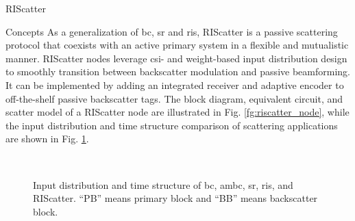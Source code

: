 \documentclass[journal]{IEEEtran}
\begin{document}
\begin{section}{RIScatter}
	\begin{subsection}{Concepts}
		As a generalization of \gls{bc}, \gls{sr} and \gls{ris}, RIScatter is a passive scattering protocol that coexists with an active primary system in a flexible and mutualistic manner.
		RIScatter nodes leverage \gls{csi}- and weight-based input distribution design to smoothly transition between backscatter modulation and passive beamforming.
		It can be implemented by adding an integrated receiver \cite{Kim2021a} and adaptive encoder \cite{He2020e} to off-the-shelf passive backscatter tags.
		The block diagram, equivalent circuit, and scatter model of a RIScatter node are illustrated in Fig. \ref{fg:riscatter_node}, while the input distribution and time structure comparison of scattering applications are shown in Fig. \ref{fg:scatter_comparison}.
		\begin{figure*}[!t]
			\centering
			\caption{
			Block diagram, equivalent circuit, and scatter model of a RIScatter node.
			The solid and dashed vectors represent signal and energy flows.
			The scattering antenna behaves as a constant power source, where the voltage $V_0$ and current $I_0$ are introduced by incident electric field $\vec{E}_{\mathrm{I}}$ and magnetic field $\vec{H}_{\mathrm{I}}$ \cite{Huang2021}.
			}
			\label{fg:riscatter_node}
		\end{figure*}
		\begin{figure}[!t]
			\centering
			\\
			\caption{
				Input distribution and time structure of \gls{bc}, \gls{ambc}, \gls{sr}, \gls{ris}, and RIScatter.
				``PB'' means primary block and ``BB'' means backscatter block.
			}
			\label{fg:scatter_comparison}
		\end{figure}

\end{subsection}
\end{section}
\end{document}
